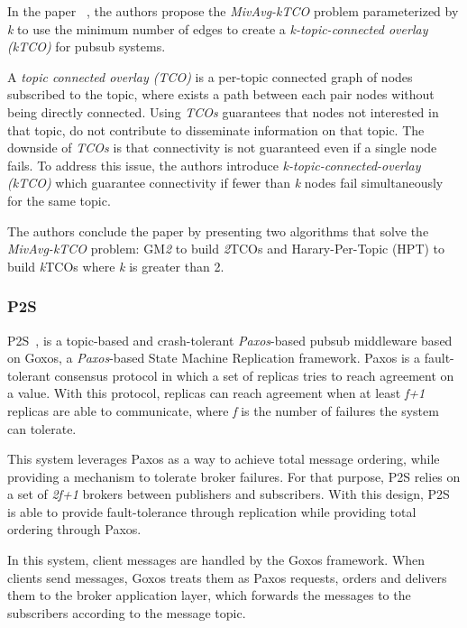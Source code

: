 In the paper ~\cite{minavg-k-tco}, the authors propose the \textit{MivAvg-kTCO} problem parameterized by \textit{k} to use the minimum number of edges to create a \textit{k-topic-connected overlay ({kTCO})} for \gls{pubsub} systems.

A \textit{topic connected overlay (TCO)} is a per-topic connected graph of nodes subscribed to the topic, where exists a path between each pair nodes without being directly connected. Using \textit{TCOs} guarantees that nodes not interested in that topic, do not contribute to disseminate information on that topic. The downside of \textit{TCOs} is that connectivity is not guaranteed even if a single node fails. To address this issue, the authors introduce \textit{k-topic-connected-overlay (kTCO)} which guarantee connectivity if fewer than \textit{k} nodes fail simultaneously for the same topic.

The authors conclude the paper by presenting two algorithms that solve the \textit{MivAvg-kTCO} problem: GM\textit{2} to build \textit{2}TCOs and Harary-Per-Topic (HPT) to build \textit{k}TCOs where \textit{k} is greater than 2.

\subsubsection{P2S}
\label{sec:p2s}

P2S~\cite{p2s}, is a topic-based and crash-tolerant \textit{Paxos}-based \gls{pubsub} middleware based on Goxos, a \textit{Paxos}-based State Machine Replication framework. Paxos is a fault-tolerant consensus protocol in which a set of replicas tries to reach agreement on a value. With this protocol, replicas can reach agreement when at least \textit{f+1} replicas are able to communicate, where \textit{f} is the number of failures the system can tolerate.

This system leverages Paxos as a way to achieve total message ordering, while providing a mechanism to tolerate broker failures. For that purpose, P2S relies on a set of \textit{2f+1} brokers between publishers and subscribers. With this design, P2S is able to provide fault-tolerance through replication while providing total ordering through Paxos.

In this system, client messages are handled by the Goxos framework. When clients send messages, Goxos treats them as Paxos requests, orders and delivers them to the broker application layer, which forwards the messages to the subscribers according to the message topic.

